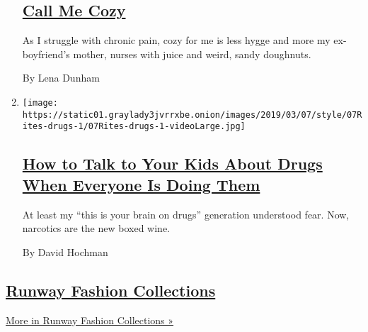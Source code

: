 \begin{enumerate}
  \hypertarget{call-me-cozy}{%
  \subsection{\texorpdfstring{\href{/2019/03/14/style/lena-dunham-cozy.html}{Call
  Me Cozy}}{Call Me Cozy}}\label{call-me-cozy}}

  As I struggle with chronic pain, cozy for me is less hygge and more my
  ex-boyfriend's mother, nurses with juice and weird, sandy doughnuts.

  By Lena Dunham
\item
  \texttt{[image: https://static01.graylady3jvrrxbe.onion/images/2019/03/07/style/07Rites-drugs-1/07Rites-drugs-1-videoLarge.jpg]}

  \hypertarget{how-to-talk-to-your-kids-about-drugs-when-everyone-is-doing-them}{%
  \subsection{\texorpdfstring{\href{/2019/03/07/style/how-to-talk-to-your-kids-about-drugs-when-everyone-is-doing-them.html}{How
  to Talk to Your Kids About Drugs When Everyone Is Doing
  Them}}{How to Talk to Your Kids About Drugs When Everyone Is Doing Them}}\label{how-to-talk-to-your-kids-about-drugs-when-everyone-is-doing-them}}

  At least my ``this is your brain on drugs'' generation understood
  fear. Now, narcotics are the new boxed wine.

  By David Hochman
\end{enumerate}

\hypertarget{runway-fashion-collections}{%
\subsection{\texorpdfstring{\href{/spotlight/fashion-runway-slideshows}{Runway
Fashion
Collections}}{Runway Fashion Collections}}\label{runway-fashion-collections}}

\href{/spotlight/fashion-runway-slideshows}{More in Runway Fashion
Collections »}

